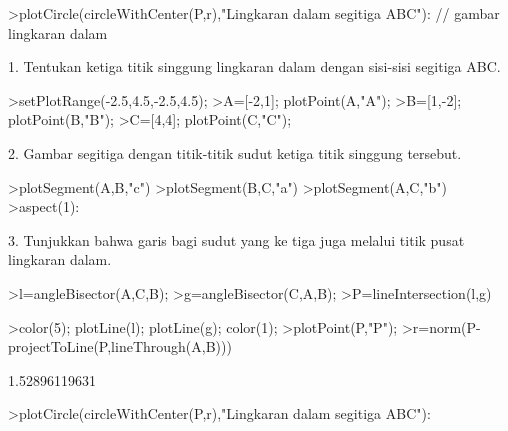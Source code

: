 \documentclass[a4paper,10pt]{article}
\begin{document}
\begin{eulernotebook}
\begin{eulercomment}
\begin{eulercomment}
\begin{eulercomment}
\begin{eulercomment}
\begin{eulercomment}
\begin{eulercomment}
\begin{eulercomment}
\begin{eulercomment}
\begin{eulercomment}
\begin{eulercomment}
\begin{eulercomment}
\begin{eulercomment}
\begin{eulercomment}
\begin{eulercomment}
\begin{eulercomment}
\begin{eulercomment}
\begin{eulercomment}
\begin{eulercomment}
\begin{eulercomment}
\begin{eulercomment}
\begin{eulercomment}
\begin{eulercomment}
\begin{eulercomment}
\begin{eulercomment}
\begin{eulercomment}
\begin{eulercomment}
\begin{eulercomment}
\begin{eulercomment}
\begin{eulercomment}
\begin{eulercomment}
\begin{eulerprompt}
>plotCircle(circleWithCenter(P,r),"Lingkaran dalam segitiga ABC"): // gambar lingkaran dalam
\end{eulerprompt}
\begin{eulercomment}
1. Tentukan ketiga titik singgung lingkaran dalam dengan sisi-sisi
segitiga ABC.
\end{eulercomment}
\begin{eulerprompt}
>setPlotRange(-2.5,4.5,-2.5,4.5);
>A=[-2,1]; plotPoint(A,"A");
>B=[1,-2]; plotPoint(B,"B");
>C=[4,4]; plotPoint(C,"C");
\end{eulerprompt}
\begin{eulercomment}
2. Gambar segitiga dengan titik-titik sudut ketiga titik singgung
tersebut.
\end{eulercomment}
\begin{eulerprompt}
>plotSegment(A,B,"c")
>plotSegment(B,C,"a")
>plotSegment(A,C,"b")
>aspect(1):
\end{eulerprompt}
\begin{eulercomment}
3. Tunjukkan bahwa garis bagi sudut yang ke tiga juga melalui titik
pusat lingkaran dalam.
\end{eulercomment}
\begin{eulerprompt}
>l=angleBisector(A,C,B);
>g=angleBisector(C,A,B);
>P=lineIntersection(l,g)
\end{eulerprompt}
\begin{euleroutput}
  [0.581139,  0.581139]
\end{euleroutput}
\begin{eulerprompt}
>color(5); plotLine(l); plotLine(g); color(1);
>plotPoint(P,"P");
>r=norm(P-projectToLine(P,lineThrough(A,B)))
\end{eulerprompt}
\begin{euleroutput}
  1.52896119631
\end{euleroutput}
\begin{eulerprompt}
>plotCircle(circleWithCenter(P,r),"Lingkaran dalam segitiga ABC"):
\end{eulerprompt}

\end{eulercomment}
\end{eulercomment}
\end{eulercomment}
\end{eulercomment}
\end{eulercomment}
\end{eulercomment}
\end{eulercomment}
\end{eulercomment}
\end{eulercomment}
\end{eulercomment}
\end{eulercomment}
\end{eulercomment}
\end{eulercomment}
\end{eulercomment}
\end{eulercomment}
\end{eulercomment}
\end{eulercomment}
\end{eulercomment}
\end{eulercomment}
\end{eulercomment}
\end{eulercomment}
\end{eulercomment}
\end{eulercomment}
\end{eulercomment}
\end{eulercomment}
\end{eulercomment}
\end{eulercomment}
\end{eulercomment}
\end{eulercomment}
\end{eulercomment}
\end{eulernotebook}
\end{document}
